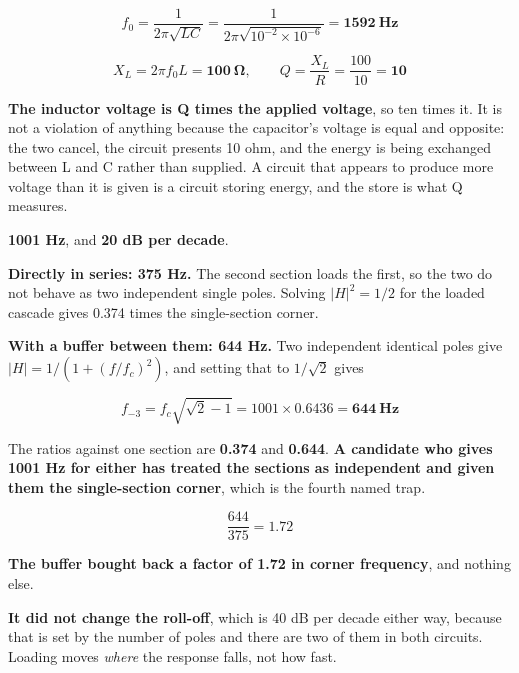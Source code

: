 
\[
  f_0 = \frac{1}{2\pi\sqrt{LC}} = \frac{1}{2\pi\sqrt{10^{-2} \times 10^{-6}}}
  = \mathbf{1592\ \text{Hz}}
\]

\[
  X_L = 2\pi f_0 L = \mathbf{100\ \Omega}, \qquad Q = \frac{X_L}{R} = \frac{100}{10} = \mathbf{10}
\]

\textbf{The inductor voltage is Q times the applied voltage}, so ten times it. It is not a violation of anything because the capacitor's voltage is equal and opposite: the two cancel, the circuit presents 10 ohm, and the energy is being exchanged between L and C rather than supplied. A circuit that appears to produce more voltage than it is given is a circuit storing energy, and the store is what Q measures.



\textbf{1001 Hz}, and \textbf{20 dB per decade}.


\textbf{Directly in series: 375 Hz.} The second section loads the first, so the two do not behave as two independent single poles. Solving $|H|^2 = 1/2$ for the loaded cascade gives 0.374 times the single-section corner.

\textbf{With a buffer between them: 644 Hz.} Two independent identical poles give $|H| = 1/(1 + (f/f_c)^2)$, and setting that to $1/\sqrt2$ gives

\[
  f_{-3} = f_c\sqrt{\sqrt2 - 1} = 1001 \times 0.6436 = \mathbf{644\ \text{Hz}}
\]

The ratios against one section are \textbf{0.374} and \textbf{0.644}. \textbf{A candidate who gives 1001 Hz for either has treated the sections as independent and given them the single-section corner}, which is the fourth named trap.


\[
  \frac{644}{375} = \mathbf{1.72}
\]

\textbf{The buffer bought back a factor of 1.72 in corner frequency}, and nothing else.

\textbf{It did not change the roll-off}, which is 40 dB per decade either way, because that is set by the number of poles and there are two of them in both circuits. Loading moves \emph{where} the response falls, not how fast.


